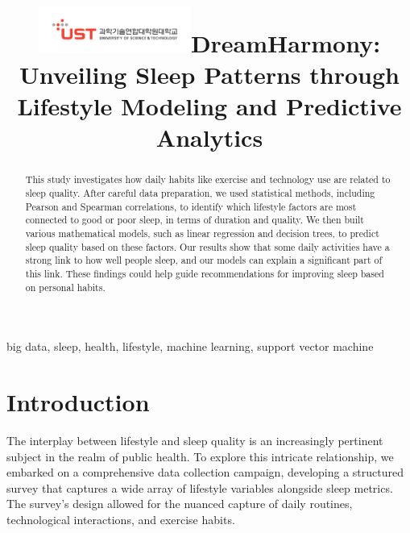 \documentclass[conference]{IEEEtran}
\begin{document}

\title{\includegraphics[width=5cm]{images/ust.png}\linebreak DreamHarmony: Unveiling Sleep Patterns through Lifestyle Modeling and Predictive Analytics
}


\author{
}
\maketitle

\begin{abstract}
    This study investigates how daily habits like exercise and technology use are related to sleep quality. After careful data preparation, we used statistical methods, including Pearson\cite{pearson} and Spearman correlations\cite{spearman}, to identify which lifestyle factors are most connected to good or poor sleep, in terms of duration and quality. We then built various mathematical models, such as linear regression and decision trees, to predict sleep quality based on these factors. Our results show that some daily activities have a strong link to how well people sleep, and our models can explain a significant part of this link. These findings could help guide recommendations for improving sleep based on personal habits.
\end{abstract}

\begin{IEEEkeywords}
    big data, sleep, health, lifestyle, machine learning, support vector machine
\end{IEEEkeywords}

\section{Introduction}
The interplay between lifestyle and sleep quality is an increasingly pertinent subject in the realm of public health. To explore this intricate relationship, we embarked on a comprehensive data collection campaign, developing a structured survey that captures a wide array of lifestyle variables alongside sleep metrics. The survey's design allowed for the nuanced capture of daily routines, technological interactions, and exercise habits.
\end{document}
